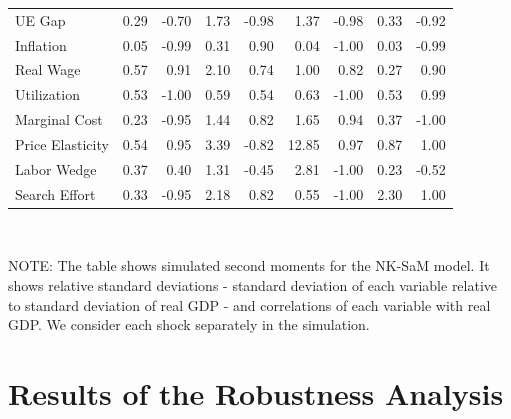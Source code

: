 \documentclass[12pt,3p,authoryear,review]{elsarticle}
\begin{document}
\begin{table}[h!]
\begin{center}
\begin{footnotesize}
\begin{tabular}{l r r r r r r r r}
				UE Gap & 0.29 & -0.70 & 1.73 & -0.98 & 1.37 & -0.98 & 0.33 & -0.92\\%
				Inflation & 0.05 & -0.99 & 0.31 & 0.90 & 0.04 & -1.00 & 0.03 & -0.99\\%
				Real Wage & 0.57 & 0.91 & 2.10 & 0.74 & 1.00 & 0.82 & 0.27 & 0.90\\%
				Utilization & 0.53 & -1.00 & 0.59 & 0.54 & 0.63 & -1.00 & 0.53 & 0.99\\%
				Marginal Cost & 0.23 & -0.95 & 1.44 & 0.82 & 1.65 & 0.94 & 0.37 & -1.00\\%
				Price Elasticity & 0.54 & 0.95 & 3.39 & -0.82 & 12.85 & 0.97 & 0.87 & 1.00\\%
				Labor Wedge & 0.37 & 0.40 & 1.31 & -0.45 & 2.81 & -1.00 & 0.23 & -0.52\\%
				Search Effort & 0.33 & -0.95 & 2.18 & 0.82 & 0.55 & -1.00 & 2.30 & 1.00\\%
				\hline%
			\end{tabular}\\%
			\vspace{0.1in}%
			{\tiny NOTE: The table shows simulated second moments for the NK-SaM model. It shows relative standard deviations - standard deviation of each variable relative to standard deviation of real GDP - and correlations of each variable with real GDP. We consider each shock separately in the simulation.\par}%
		\end{footnotesize}%
	\end{center}%
\end{table}%
\clearpage%
\FloatBarrier%
\section{Results of the Robustness Analysis}\label{sec:robust}%
\end{document}
